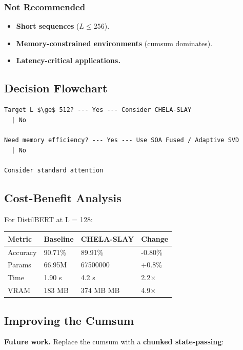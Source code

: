 \subsubsection{Not Recommended}
\begin{itemize}
\item \textbf{Short sequences} ($L \leq 256$).
\item \textbf{Memory-constrained environments} (cumsum dominates).
\item \textbf{Latency-critical applications.}

\end{itemize}
\subsection{Decision Flowchart}

\begin{lstlisting}
Target L $\ge$ 512? --- Yes --- Consider CHELA-SLAY
  | No
   
Need memory efficiency? --- Yes --- Use SOA Fused / Adaptive SVD
  | No
   
Consider standard attention
\end{lstlisting}

\subsection{Cost-Benefit Analysis}

For DistilBERT at L = 128:

\begin{table}[H]
\centering
\small
\begin{tabular}{llll}
\toprule
\textbf{Metric} & \textbf{Baseline} & \textbf{CHELA-SLAY} & \textbf{Change} \\
\midrule
Accuracy & 90.71\% & 89.91\% & -0.80\% \\
Params & 66.95M & 67500000 & +0.8\% \\
Time & 1.90 s & 4.2 s & 2.2$\times$ \\
VRAM & 183 MB & 374 MB MB & 4.9$\times$ \\
\bottomrule
\end{tabular}
\end{table}

\subsection{Improving the Cumsum}

\textbf{Future work.} Replace the cumsum with a \textbf{chunked state-passing}:

